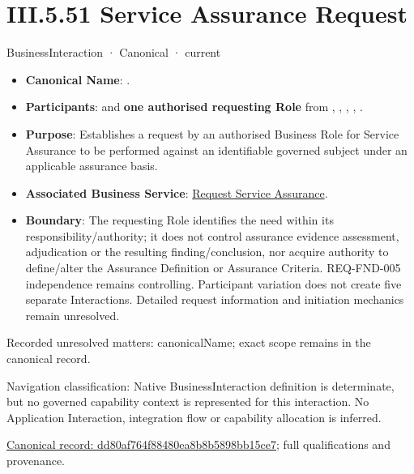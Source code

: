 \section*{III.5.51 Service Assurance Request}
\label{navigation:III.5.51}

\label{element:dd80af764f88480ea8b8b5898bb15ce7}
{\small BusinessInteraction · Canonical · current}\par

\begin{itemize}


\item \textbf{Canonical Name}: \texttt{}.

\item \textbf{Participants}: \texttt{} and \textbf{one authorised requesting Role} from \texttt{}, \texttt{}, \texttt{}, \texttt{}, \texttt{}.

\item \textbf{Purpose}: Establishes a request by an authorised Business Role for Service Assurance to be performed against an identifiable governed subject under an applicable assurance basis.

\item \textbf{Associated Business Service}: \href{\detokenize{../../../../../../../../docs/markdown/03-business-architecture/behaviours/health-service-assurance.md#request-service-assurance}}{Request Service Assurance}.

\item \textbf{Boundary}: The requesting Role identifies the need within its responsibility/authority; it does not control assurance evidence assessment, adjudication or the resulting finding/conclusion, nor acquire authority to define/alter the Assurance Definition or Assurance Criteria. REQ-FND-005 independence remains controlling. Participant variation does not create five separate Interactions. Detailed request information and initiation mechanics remain unresolved.

\end{itemize}

{\small Recorded unresolved matters: canonicalName; exact scope remains in the canonical record.}\par
{\small Navigation classification: Native BusinessInteraction definition is determinate, but no governed capability context is represented for this interaction. No Application Interaction, integration flow or capability allocation is inferred.}\par
{\footnotesize \href{../../../../../../../continuum/business/business-interaction/dd80af764f88480ea8b8b5898bb15ce7.md}{Canonical record: dd80af764f88480ea8b8b5898bb15ce7}; full qualifications and provenance.}\par
